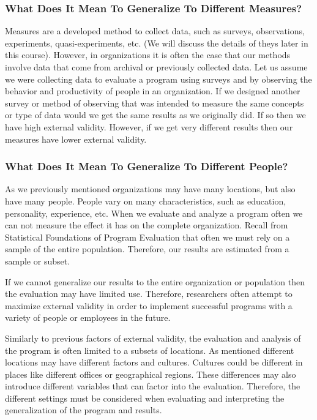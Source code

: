 \documentclass[]{book}
\theoremstyle{definition}
\theoremstyle{definition}
\theoremstyle{definition}
\theoremstyle{remark}
\begin{document}
\hypertarget{what-does-it-mean-to-generalize-to-different-measures}{%
\subsubsection{What Does It Mean To Generalize To Different
Measures?}\label{what-does-it-mean-to-generalize-to-different-measures}}

Measures are a developed method to collect data, such as surveys,
observations, experiments, quasi-experiments, etc. (We will discuss the
details of theys later in this course). However, in organizations it is
often the case that our methods involve data that come from archival or
previously collected data. Let us assume we were collecting data to
evaluate a program using surveys and by observing the behavior and
productivity of people in an organization. If we designed another survey
or method of observing that was intended to measure the same concepts or
type of data would we get the same results as we originally did. If so
then we have high external validity. However, if we get very different
results then our measures have lower external validity.

\hypertarget{what-does-it-mean-to-generalize-to-different-people}{%
\subsubsection{What Does It Mean To Generalize To Different
People?}\label{what-does-it-mean-to-generalize-to-different-people}}

As we previously mentioned organizations may have many locations, but
also have many people. People vary on many characteristics, such as
education, personality, experience, etc. When we evaluate and analyze a
program often we can not measure the effect it has on the complete
organization. Recall from Statistical Foundations of Program Evaluation
that often we must rely on a sample of the entire population. Therefore,
our results are estimated from a sample or subset.

If we cannot generalize our results to the entire organization or
population then the evaluation may have limited use. Therefore,
researchers often attempt to maximize external validity in order to
implement successful programs with a variety of people or employees in
the future.

Similarly to previous factors of external validity, the evaluation and
analysis of the program is often limited to a subsets of locations. As
mentioned different locations may have different factors and cultures.
Cultures could be different in places like different offices or
geographical regions. These differences may also introduce different
variables that can factor into the evaluation. Therefore, the different
settings must be considered when evaluating and interpreting the
generalization of the program and results.
\end{document}
